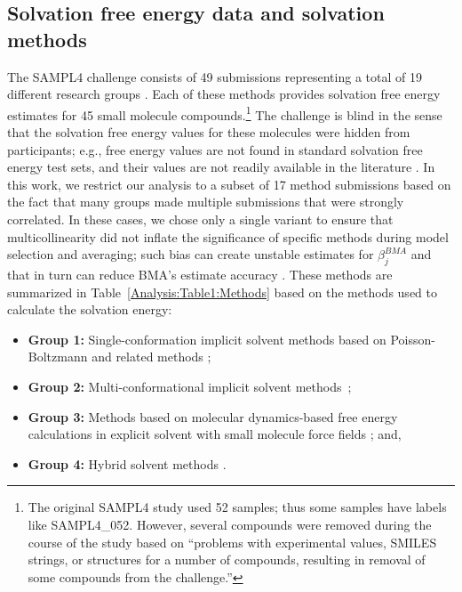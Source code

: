 \documentclass[journal=jpcbfk, manuscript=article]{achemso}
\newcommand{\+}[1]{\ensuremath{\mathbf{#1}}}
\newcommand{\rev}[1]{#1}
\begin{document}
\subsection{Solvation free energy data and solvation methods} \label{EP:DataModels}
The SAMPL4 challenge consists of 49 submissions representing a total of 19 different research groups \cite{Mobley:2014}.
Each of these methods provides solvation free energy estimates for 45 small molecule compounds.\footnote{\rev{The original SAMPL4 study used 52 samples; thus some samples have labels like SAMPL4\_052.
However, several compounds were removed during the course of the study based on ``problems with experimental values, SMILES strings, or structures for a number of compounds, resulting in removal of some compounds from the challenge.''\cite{Mobley:2014}}}
The challenge is blind in the sense that the solvation free energy values for these molecules were hidden from participants; e.g., free energy values are not found in standard solvation free energy test sets, and their values are not readily available in the literature \cite{Guthrie:2014}. 
In this work, we restrict our analysis to a subset of 17 method submissions based on the fact that many groups made multiple submissions that were strongly correlated.
In these cases, we chose only a single variant to ensure that multicollinearity did not inflate the significance of specific methods during model selection and averaging; such bias can create unstable estimates for $\beta^{BMA}_j$ and that \rev{in turn} can reduce BMA's \rev{estimate} accuracy \cite{Clyde:1999}.
These methods are summarized in Table~\ref{Analysis:Table1:Methods} based on the methods used to calculate the solvation energy: 
\begin{itemize} 
	\item \textbf{Group 1:} Single-conformation implicit solvent methods \cite{Ellingson:2014, Nicholl:2010, Hawkins} based on Poisson-Boltzmann and related methods \cite{Fixman:1979, Honig:1995, Davis:1990};
	\item \textbf{Group 2:} Multi-conformational implicit solvent methods~\cite{Sandberg:2013, Klamt:2009, Hogues:2014, Sulea:2011, Reinisch:2014}; 
	\item \textbf{Group 3:} Methods based on molecular dynamics-based free energy calculations in explicit solvent \cite{Klimovich:2010,Muddana:2014,Mobley:2009c,Mobley:2007} with small molecule force fields \cite{Wang:2004B};  and, 
	\item \textbf{Group 4:} Hybrid solvent methods \cite{Li:2014}.
\end{itemize}
\end{document}
